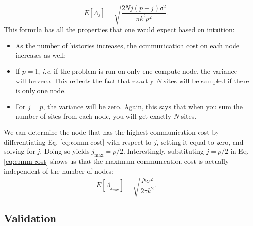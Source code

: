 \begin{equation}\label{eq:comm-cost}
  E \left [ \Lambda_j \right ] = \sqrt{\frac{2Nj(p-j)\sigma^2}{\pi
      k^2p^2}}.
\end{equation}
This formula has all the properties that one would expect based on
intuition:
\begin{itemize}
\item As the number of histories increases, the communication cost on
  each node increases as well;
\item If $p=1$, {\em i.e.} if the problem is run on only one compute
  node, the variance will be zero. This reflects the fact that exactly
  $N$ sites will be sampled if there is only one node.
\item For $j=p$, the variance will be zero. Again, this says that when
  you sum the number of sites from each node, you will get exactly $N$
  sites.
\end{itemize}
We can determine the node that has the highest communication cost by
differentiating Eq. \ref{eq:comm-cost} with respect to $j$, setting it
equal to zero, and solving for $j$. Doing so yields $j_{\text{max}} =
p/2$. Interestingly, substituting $j = p/2$ in Eq. \ref{eq:comm-cost}
shows us that the maximum communication cost is actually independent
of the number of nodes:
\begin{equation}
  E \left [ \Lambda_{j_{\text{max}}} \right ] = \sqrt{
    \frac{N\sigma^2}{2\pi k^2}}.
\end{equation}

\subsection{Validation}

